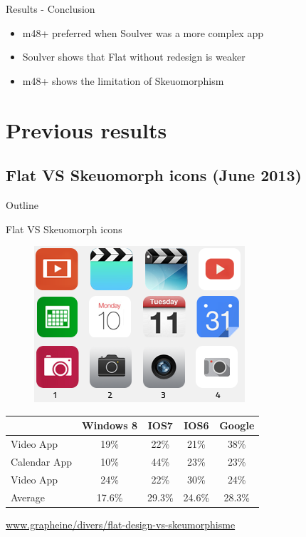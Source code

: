 \documentclass{beamer}
\begin{document}
\begin{frame}{Results - Conclusion}
    \begin{itemize}
        \item m48+ preferred when Soulver was a more complex app
        \item Soulver shows that Flat without redesign is weaker
        \item m48+ shows the limitation of Skeuomorphism
    \end{itemize}
\end{frame}


\section{Previous results}
\subsection{Flat VS Skeuomorph icons (June 2013)}

\begin{frame}{Outline}
    \tableofcontents[currentsection]
\end{frame}

\begin{frame}{Flat VS Skeuomorph icons}
	\begin{figure}
	\centering
	\includegraphics[scale=0.5]{flat.png}
	\end{figure}
    \begin{center}
      \begin{tabular}{|l|c|c|c|c|}
        \hline
        &Windows 8 & IOS7 & IOS6 & Google\\
        \hline
        Video App 	& 19\%	& 22\%	& 21\%	& 38\% \\
        Calendar App& 10\%	& 44\%	& 23\%	& 23\% \\
        Video App	& 24\%	& 22\%	& 30\%	& 24\% \\
        \hline
        Average		& 17.6\%& 29.3\%& 24.6\%& 28.3\% \\
        \hline
      \end{tabular}
    \end{center}
    	\begin{flushright}\tiny\url{www.grapheine/divers/flat-design-vs-skeumorphisme}\normalsize\end{flushright}
\end{frame}
\end{document}
